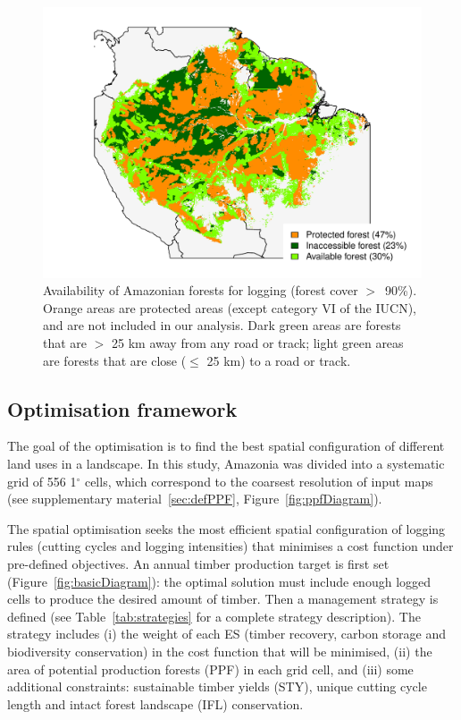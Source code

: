 \documentclass{article}
\begin{document}
\begin{figure}
    \centering
    \includegraphics[width=\linewidth]{graphs/harv_areas.pdf}
    \caption{Availability of Amazonian forests for logging (forest cover $>$~90\%). Orange areas are protected areas (except category VI of the IUCN), and are not included in our analysis. Dark green areas are forests that are $>$ 25 km away from any road or track; light green areas are forests that are close ($\leq$ 25 km) to a road or track.}
    \label{fig:pharv}
\end{figure}


\subsection{Optimisation framework}

The goal of the optimisation is to find the best spatial configuration of different land uses in a landscape. In this study, Amazonia was divided into a systematic grid of 556 1$^{\circ}$ cells, which correspond to the coarsest resolution of input maps (see supplementary material~\ref{sec:defPPF}, Figure~\ref{fig:ppfDiagram}). 

The spatial optimisation seeks the most efficient spatial configuration of logging rules (cutting cycles and logging intensities) that minimises a cost function under pre-defined objectives. An annual timber production target is first set (Figure~\ref{fig:basicDiagram}): the optimal solution must include enough logged cells to produce the desired amount of timber. Then a management strategy is defined (see Table~\ref{tab:strategies} for a complete strategy description). The strategy includes (i) the weight of each ES (timber recovery, carbon storage and biodiversity conservation) in the cost function that will be minimised, (ii) the area of potential production forests (PPF) in each grid cell, and (iii) some additional constraints: sustainable timber yields (STY), unique cutting cycle length and intact forest landscape (IFL) conservation. 
\end{document}
